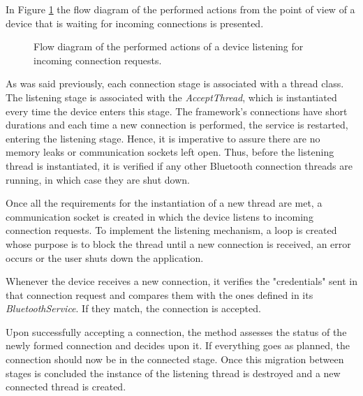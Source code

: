 In Figure \ref{fig:btreceiver} the flow diagram of the performed actions from the point of view of a device that is waiting for incoming connections is presented.

\begin{figure}[ht]
	\noindent{}
	\caption{\label{fig:btreceiver} Flow diagram of the performed actions of a device listening for incoming connection requests.}
\end{figure}

As was said previously, each connection stage is associated with a thread class. The listening stage is associated with the \textit{AcceptThread}, which is instantiated every time the device enters this stage. The framework's connections have short durations and each time a new connection is performed, the service is restarted, entering the listening stage. Hence, it is imperative to assure there are no memory leaks or communication sockets left open. Thus, before the listening thread is instantiated, it is verified if any other Bluetooth connection threads are running, in which case they are shut down.

Once all the requirements for the instantiation of a new thread are met, a communication socket is created in which the device listens to incoming connection requests. To implement the listening mechanism, a loop is created whose purpose is to block the thread until a new connection is received, an error occurs or the user shuts down the application.

Whenever the device receives a new connection, it verifies the "credentials" sent in that connection request and compares them with the ones defined in its \textit{BluetoothService}. If they match, the connection is accepted.

Upon successfully accepting a connection, the method assesses the status of the newly formed connection and decides upon it. If everything goes as planned, the connection should now be in the connected stage. Once this migration between stages is concluded the instance of the listening thread is destroyed and a new connected thread is created.

